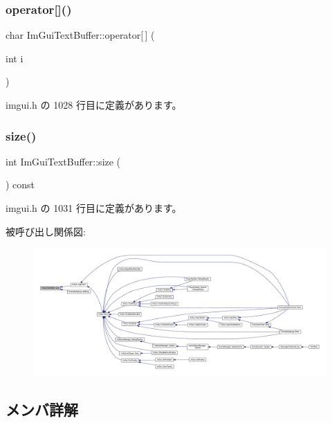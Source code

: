 \subsubsection{\texorpdfstring{operator[]()}{operator[]()}}
{\footnotesize\ttfamily char Im\+Gui\+Text\+Buffer\+::operator\mbox{[}$\,$\mbox{]} (\begin{DoxyParamCaption}\item[{int}]{i }\end{DoxyParamCaption})\hspace{0.3cm}{\ttfamily [inline]}}



 imgui.\+h の 1028 行目に定義があります。

\mbox{\label{struct_im_gui_text_buffer_a2811fcd43e0224eb3bd0f3464b634289}} 
\subsubsection{\texorpdfstring{size()}{size()}}
{\footnotesize\ttfamily int Im\+Gui\+Text\+Buffer\+::size (\begin{DoxyParamCaption}{ }\end{DoxyParamCaption}) const\hspace{0.3cm}{\ttfamily [inline]}}



 imgui.\+h の 1031 行目に定義があります。

被呼び出し関係図\+:
\nopagebreak
\begin{figure}[H]
\begin{center}
\leavevmode
\includegraphics[width=350pt]{struct_im_gui_text_buffer_a2811fcd43e0224eb3bd0f3464b634289_icgraph}
\end{center}
\end{figure}


\subsection{メンバ詳解}
\mbox{\label{struct_im_gui_text_buffer_aa6de034b1920cdae5505cc58abf14240}} 
